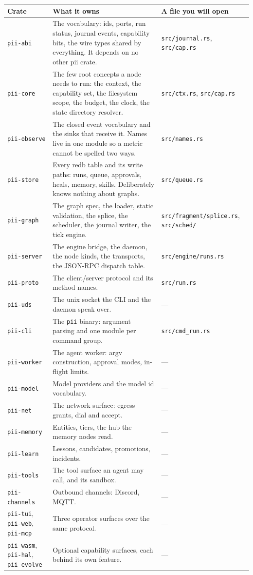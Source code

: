\begin{longtable}{@{}p{}p{}p{}@{}}
	\toprule
	\textbf{Crate} & \textbf{What it owns} & \textbf{A file you will open} \\
	\midrule
	\endhead
	\texttt{pii-abi} & The vocabulary: ids, ports, run status, journal events, capability bits, the
	wire types shared by everything. It depends on no other pii crate. & \texttt{src/journal.rs},
	\texttt{src/cap.rs} \\
	\texttt{pii-core} & The few root concepts a node needs to run: the context, the capability set,
	the filesystem scope, the budget, the clock, the state directory resolver. & \texttt{src/ctx.rs},
	\texttt{src/cap.rs} \\
	\texttt{pii-observe} & The closed event vocabulary and the sinks that receive it. Names live in
	one module so a metric cannot be spelled two ways. & \texttt{src/names.rs} \\
	\texttt{pii-store} & Every redb table and its write paths: runs, queue, approvals, heals, memory,
	skills. Deliberately knows nothing about graphs. & \texttt{src/queue.rs} \\
	\texttt{pii-graph} & The graph spec, the loader, static validation, the splice, the scheduler,
	the journal writer, the tick engine. & \texttt{src/fragment/splice.rs}, \texttt{src/sched/} \\
	\texttt{pii-server} & The engine bridge, the daemon, the node kinds, the transports, the JSON-RPC
	dispatch table. & \texttt{src/engine/runs.rs} \\
	\texttt{pii-proto} & The client/server protocol and its method names. & \texttt{src/run.rs} \\
	\texttt{pii-uds} & The unix socket the CLI and the daemon speak over. & --- \\
	\texttt{pii-cli} & The \texttt{pii} binary: argument parsing and one module per command group.
	& \texttt{src/cmd\_run.rs} \\
	\texttt{pii-worker} & The agent worker: argv construction, approval modes, in-flight limits.
	& --- \\
	\texttt{pii-model} & Model providers and the model id vocabulary. & --- \\
	\texttt{pii-net} & The network surface: egress grants, dial and accept. & --- \\
	\texttt{pii-memory} & Entities, tiers, the hub the memory nodes read. & --- \\
	\texttt{pii-learn} & Lessons, candidates, promotions, incidents. & --- \\
	\texttt{pii-tools} & The tool surface an agent may call, and its sandbox. & --- \\
	\texttt{pii-channels} & Outbound channels: Discord, MQTT. & --- \\
	\texttt{pii-tui}, \texttt{pii-web}, \texttt{pii-mcp} & Three operator surfaces over the same
	protocol. & --- \\
	\texttt{pii-wasm}, \texttt{pii-hal}, \texttt{pii-evolve} & Optional capability surfaces, each
	behind its own feature. & --- \\
	\bottomrule
\end{longtable}

